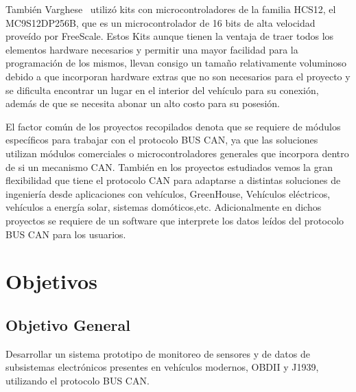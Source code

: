 También Varghese~\cite{ICAN} utilizó kits con microcontroladores de la familia HCS12, el MC9S12DP256B, que es un microcontrolador de 16 bits de alta velocidad proveído por FreeScale. 
Estos Kits aunque tienen la ventaja de traer todos los elementos hardware necesarios y permitir una mayor facilidad para la programación de los mismos, llevan consigo un tamaño relativamente voluminoso debido a que incorporan hardware extras que no son necesarios para el proyecto y se dificulta encontrar un lugar en el interior del vehículo para su conexión, además de que se necesita abonar un alto costo para su posesión.

El factor  común de los proyectos recopilados denota que se requiere de módulos específicos para trabajar con el protocolo BUS CAN, ya que las soluciones  utilizan módulos comerciales  o microcontroladores generales que incorpora dentro de si un mecanismo CAN. 
También en los proyectos estudiados vemos la gran flexibilidad que tiene el protocolo CAN para adaptarse a distintas soluciones de ingeniería desde aplicaciones con vehículos, GreenHouse, Vehículos eléctricos, vehículos a energía solar, sistemas domóticos,etc. 
Adicionalmente en dichos proyectos se requiere de un software que interprete los datos leídos del protocolo BUS CAN para los usuarios.  



 
 


\newpage

\section{Objetivos}


\subsection{Objetivo General}

Desarrollar un sistema prototipo de monitoreo de sensores y de datos de subsistemas electrónicos presentes en vehículos modernos, OBDII y J1939,  utilizando el protocolo BUS CAN.

